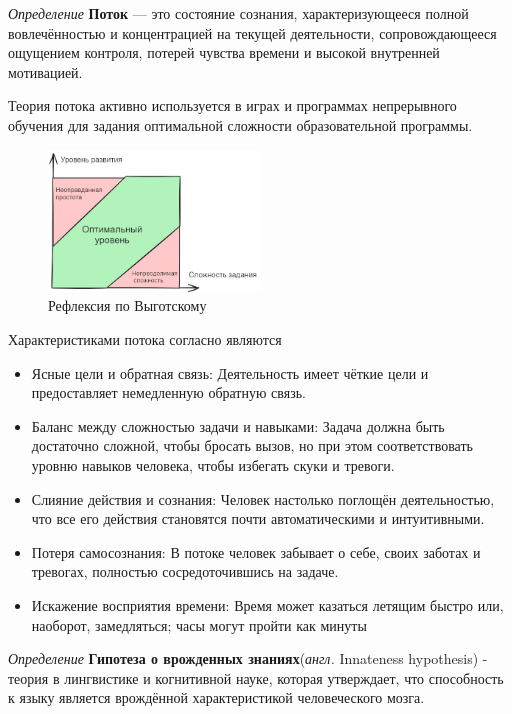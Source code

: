 \textit{Определение} \textbf{Поток} — это состояние сознания, характеризующееся полной вовлечённостью и концентрацией
на текущей деятельности, сопровождающееся ощущением контроля, потерей чувства времени и высокой внутренней мотивацией.

Теория потока активно используется в играх \cite{chen2007flow} и программах непрерывного обучения \cite{jarvis2009routledge} для
задания оптимальной сложности образовательной программы.

\begin{figure}[h]
    \centering
    \includegraphics[width=0.5\textwidth]{assets/pedagogic/psy/flow.excalidraw.png}
    \caption{Рефлексия по Выготскому \cite{выготский2014мышление}}
    \label{reflection}
\end{figure}

Характеристиками потока согласно \cite{csikszentmihalyi2005flow} являются \begin{itemize}
    \item Ясные цели и обратная связь: Деятельность имеет чёткие цели и предоставляет немедленную обратную связь.
    \item Баланс между сложностью задачи и навыками: Задача должна быть достаточно сложной, чтобы бросать вызов, но при этом соответствовать уровню навыков человека, чтобы избегать скуки и тревоги.
    \item Слияние действия и сознания: Человек настолько поглощён деятельностью, что все его действия становятся почти автоматическими и интуитивными.
    \item Потеря самосознания: В потоке человек забывает о себе, своих заботах и тревогах, полностью сосредоточившись на задаче.
    \item Искажение восприятия времени: Время может казаться летящим быстро или, наоборот, замедляться; часы могут пройти как минуты
\end{itemize}


\textit{Определение} \textbf{Гипотеза о врожденных знаниях}(\textit{англ.} Innateness hypothesis) - теория в лингвистике и когнитивной науке,
 которая утверждает, что способность к языку является врождённой характеристикой человеческого мозга. 

